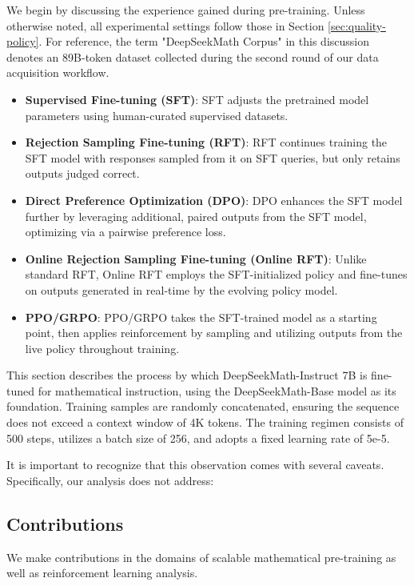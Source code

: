 We begin by discussing the experience gained during pre-training. Unless otherwise noted, all experimental settings follow those in Section \ref{sec:quality-policy}. For reference, the term "DeepSeekMath Corpus" in this discussion denotes an 89B-token dataset collected during the second round of our data acquisition workflow.

\begin{itemize}
    \item  \textbf{Supervised Fine-tuning (SFT)}: SFT adjusts the pretrained model parameters using human-curated supervised datasets.
    \item \textbf{Rejection Sampling Fine-tuning (RFT)}: RFT continues training the SFT model with responses sampled from it on SFT queries, but only retains outputs judged correct.
    \item \textbf{Direct Preference Optimization (DPO)}: DPO enhances the SFT model further by leveraging additional, paired outputs from the SFT model, optimizing via a pairwise preference loss.
    \item \textbf{Online Rejection Sampling Fine-tuning (Online RFT)}: Unlike standard RFT, Online RFT employs the SFT-initialized policy and fine-tunes on outputs generated in real-time by the evolving policy model.
    \item \textbf{PPO/GRPO}: PPO/GRPO takes the SFT-trained model as a starting point, then applies reinforcement by sampling and utilizing outputs from the live policy throughout training.
\end{itemize}

This section describes the process by which DeepSeekMath-Instruct 7B is fine-tuned for mathematical instruction, using the DeepSeekMath-Base model as its foundation. Training samples are randomly concatenated, ensuring the sequence does not exceed a context window of 4K tokens. The training regimen consists of 500 steps, utilizes a batch size of 256, and adopts a fixed learning rate of 5e-5.

It is important to recognize that this observation comes with several caveats. Specifically, our analysis does not address:

\subsection{Contributions}
We make contributions in the domains of scalable mathematical pre-training as well as reinforcement learning analysis.

